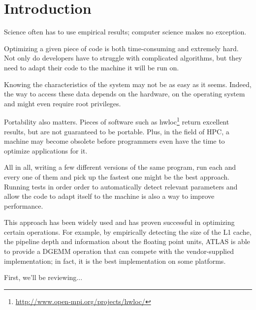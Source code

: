 \section{Introduction}
Science often has to use empirical results; computer science makes no
exception.

Optimizing a given piece of code is both time-consuming and extremely hard. Not
only do developers have to struggle with complicated algorithms, but they need
to adapt their code to the machine it will be run on.

Knowing the characteristics of the system may not be as easy as it seems.
Indeed, the way to access these data depends on the hardware, on the operating
system and might even require root privileges.

Portability also matters. Pieces of software such as
hwloc\footnote{\url{http://www.open-mpi.org/projects/hwloc/}} return excellent
results, but are not guaranteed to be portable. Plus, in the field of HPC, a
machine may become obsolete before programmers even have the time to optimize
applications for it\cite{ATLAS}\cite{Search_BLAS}.

All in all, writing a few different versions of the same program, run each and
every one of them and pick up the fastest one might be the best approach.
Running tests in order order to automatically detect relevant parameters and
allow the code to adapt itself to the machine is also a way to improve
performance.

This approach has been widely used and has proven successful in optimizing
certain operations. For example, by empirically detecting the size of the L1
cache, the pipeline depth and information about the floating point units, ATLAS
is able to provide a DGEMM operation that can compete with the vendor-supplied
implementation; in fact, it is the best implementation on some
platforms\cite{ATLAS}.

First, we'll be reviewing...
